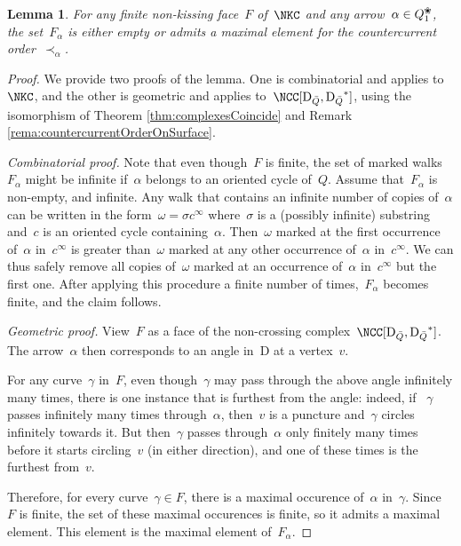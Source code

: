 \documentclass{amsart}
\newtheorem{lemma}[theorem]{Lemma}
\theoremstyle{definition}
\newcommand{\para}[1]{\medskip\noindent\textit{#1.}} %
\newcommand{\blossom}{^\text{\ding{96}}} %
\newcommand{\dual}{^*} %
\newcommand{\dissection}{\mathrm{D}} %
\begin{document}
\begin{lemma}
\label{lemm:facesHaveMaximalElement}
For any finite non-kissing face~$F$ of~$\NKC$ and any arrow~$\alpha\in Q_1\blossom$, the set~$F_\alpha$ is either empty or admits a maximal element for the countercurrent order~$\prec_\alpha$.
\end{lemma}
\begin{proof}
 We provide two proofs of the lemma.  One is combinatorial and applies to~$\NKC$, and the other is geometric and applies to~$\NCC[\dissection_{\bar Q}, {\dissection_{\bar Q}}\dual]$, using the isomorphism of Theorem \ref{thm:complexesCoincide} and Remark \ref{rema:countercurrentOrderOnSurface}.
 
 \para{Combinatorial proof}
 Note that even though~$F$ is finite, the set of marked walks~$F_\alpha$ might be infinite if~$\alpha$ belongs to an oriented cycle of~$Q$.
 Assume that~$F_\alpha$ is non-empty, and infinite.
 Any walk that contains an infinite number of copies of~$\alpha$ can be written in the form~$\omega=\sigma c^\infty$ where~$\sigma$ is a (possibly infinite) substring and~$c$ is an oriented cycle containing~$\alpha$.
 Then~$\omega$ marked at the first occurrence of~$\alpha$ in~$c^\infty$ is greater than~$\omega$ marked at any other occurrence of~$\alpha$ in~$c^\infty$.
 We can thus safely remove all copies of~$\omega$ marked at an occurrence of~$\alpha$ in~$c^\infty$ but the first one.
 After applying this procedure a finite number of times,~$F_\alpha$ becomes finite, and the claim follows.
 
 \para{Geometric proof}
 View~$F$ as a face of the non-crossing complex~$\NCC[\dissection_{\bar Q}, {\dissection_{\bar Q}}\dual]$.
 The arrow~$\alpha$ then corresponds to an angle in~$\dissection$ at a vertex~$v$.  
 
 For any curve~$\gamma$ in~$F$, even though~$\gamma$ may pass through the above angle infinitely many times, there is one instance that is furthest from the angle:
 indeed, if ~$\gamma$ passes infinitely many times through~$\alpha$, then~$v$ is a puncture and~$\gamma$ circles infinitely towards it.
 But then~$\gamma$ passes through~$\alpha$ only finitely many times before it starts circling~$v$ (in either direction), and one of these times is the furthest from~$v$.
  
 Therefore, for every curve~$\gamma\in F$, there is a maximal occurence of~$\alpha$ in~$\gamma$.
 Since~$F$ is finite, the set of these maximal occurences is finite, so it admits a maximal element.  
 This element is the maximal element of~$F_\alpha$.
\end{proof}
\end{document}
